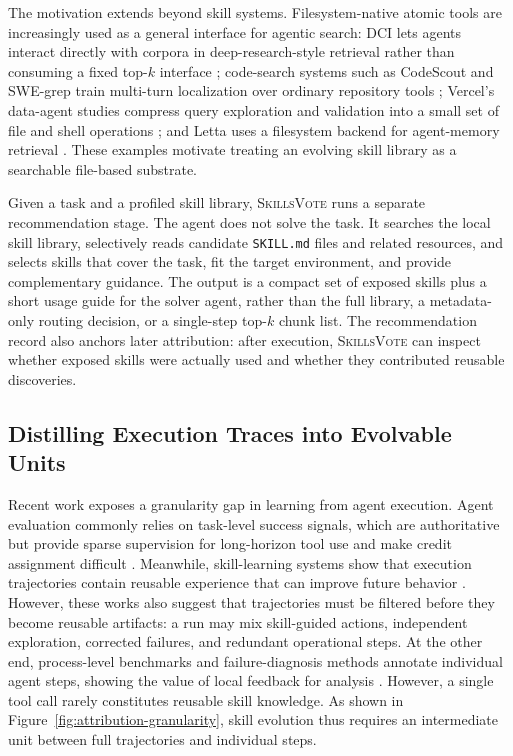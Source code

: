 \documentclass{llmxive}
\providecommand{\ours}{\textsc{SkillsVote}\xspace}
\begin{document}
The motivation extends beyond skill systems. Filesystem-native atomic tools are increasingly used as a general interface for agentic search: DCI lets agents interact directly with corpora in deep-research-style retrieval rather than consuming a fixed top-$k$ interface \citep{li2026beyond}; code-search systems such as CodeScout and SWE-grep train multi-turn localization over ordinary repository tools \citep{sutawika2026codescout,pan2025swegrep}; Vercel's data-agent studies compress query exploration and validation into a small set of file and shell operations \citep{qu2025we,goyal2026testing}; and Letta uses a filesystem backend for agent-memory retrieval \citep{letta2025benchmarking}. These examples motivate treating an evolving skill library as a searchable file-based substrate.

Given a task and a profiled skill library, \ours runs a separate recommendation stage. The agent does not solve the task. It searches the local skill library, selectively reads candidate \texttt{SKILL.md} files and related resources, and selects skills that cover the task, fit the target environment, and provide complementary guidance. The output is a compact set of exposed skills plus a short usage guide for the solver agent, rather than the full library, a metadata-only routing decision, or a single-step top-$k$ chunk list. The recommendation record also anchors later attribution: after execution, \ours can inspect whether exposed skills were actually used and whether they contributed reusable discoveries.

\subsection{Distilling Execution Traces into Evolvable Units}
Recent work exposes a granularity gap in learning from agent execution. Agent evaluation commonly relies on task-level success signals, which are authoritative but provide sparse supervision for long-horizon tool use and make credit assignment difficult \citep{fan2026agentprocessbench}. Meanwhile, skill-learning systems show that execution trajectories contain reusable experience that can improve future behavior \citep{ni2026trace2skill,fang2026trajectory}. However, these works also suggest that trajectories must be filtered before they become reusable artifacts: a run may mix skill-guided actions, independent exploration, corrected failures, and redundant operational steps. At the other end, process-level benchmarks and failure-diagnosis methods annotate individual agent steps, showing the value of local feedback for analysis \citep{fan2026agentprocessbench,barke2026agentrx}. However, a single tool call rarely constitutes reusable skill knowledge. As shown in Figure~\ref{fig:attribution-granularity}, skill evolution thus requires an intermediate unit between full trajectories and individual steps.
\end{document}
